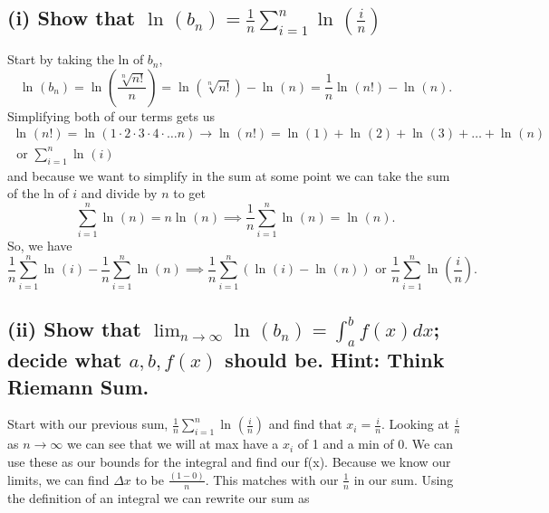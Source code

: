\subsection*{(i) Show that $ \ln^{  } \left( b_n \right) =\frac{ 1 }{ n } \sum_{ i=1 } ^{ n } \ln^{  } \left( \frac{ i }{ n }  \right)$}%
Start by taking the ln of $ b_n $,
\[
\ln^{  } \left( b_n \right) = \ln^{  } \left( \frac{ \sqrt[ n ]{ n! }  }{ n }  \right) = \ln^{  } \left( \sqrt[ n ]{ n! }  \right) - \ln^{  } \left( n \right) = \frac{ 1 }{ n } \ln^{  } \left( n! \right) -\ln^{  } \left( n \right) 
.\] 
Simplifying both of our terms gets us
\begin{gather*}
\ln^{  } \left( n! \right) = \ln^{  } \left( 1\cdot 2\cdot 3\cdot 4\cdot \ldots n \right) \to \ln^{  } \left( n! \right) = \ln^{  } \left( 1 \right) + \ln^{  } \left( 2 \right) + \ln^{  } \left( 3 \right) + \ldots + \ln^{  } \left( n \right) \\ 
\text{ or } \sum_{ i=1 } ^{ n } \ln^{  } \left( i \right)
\end{gather*}
and because we want to simplify in the sum at some point we can take the sum of the ln of $ i $ and divide by $ n $ to get
\[
\sum_{ i=1 } ^{ n }\ln^{  } \left( n \right) =n\ln^{  } \left( n \right) \implies \frac{ 1 }{ n } \sum_{ i=1 } ^{ n } \ln^{  } \left( n \right) =\ln^{  } \left( n \right)  
.\] 
So, we have
\[
\frac{ 1 }{ n } \sum_{ i=1 } ^{ n } \ln^{  } \left( i \right) - \frac{ 1 }{ n } \sum_{ i=1 } ^{ n } \ln^{  } \left( n \right) \implies \frac{ 1 }{ n } \sum_{ i=1 } ^{ n } \left( \ln^{  } \left( i \right) -\ln^{  } \left( n \right)  \right) \text{ or } \frac{ 1 }{ n } \sum_{ i=1 } ^{ n } \ln^{  } \left( \frac{ i }{ n }  \right) 
.\] 
\subsection*{(ii) Show that $ \lim_{ n \to \infty} \ln^{  } \left( b_n \right) =\int_{ a }^{ b } f\left( x \right) dx$; decide what $ a,b,f\left( x \right)  $ should be. Hint: Think Riemann Sum.}%
Start with our previous sum, $  \frac{ 1 }{ n } \sum_{ i=1 } ^{ n } \ln^{  } \left( \frac{ i }{ n }  \right) $ and find that $ x_i =\frac{ i }{ n }  $. Looking at $ \frac{ i }{ n }  $ as $ n \to \infty $ we can see that we will at max have a $ x_i $ of 1 and a min of 0. We can use these as our bounds for the integral and find our f(x). Because we know our limits, we can find $ \Delta x $ to be $ \frac{ \left( 1-0 \right)  }{ n } $. This matches with our $ \frac{ 1 }{ n } $ in our sum. Using the definition of an integral we can rewrite our sum as

